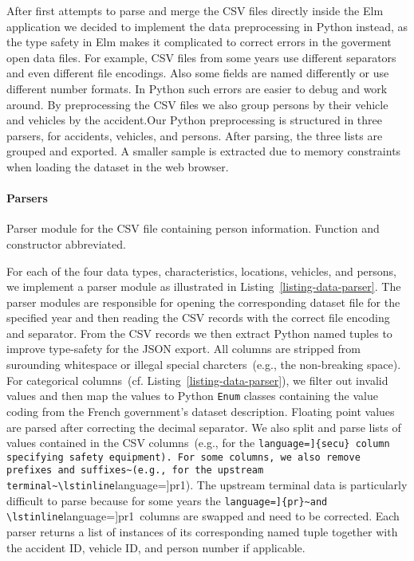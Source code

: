 After first attempts to parse and merge the CSV files directly inside the Elm application we decided to implement the data preprocessing in Python instead, as the type safety in Elm makes it complicated to correct errors in the goverment open data files. For example, CSV files from some years use different separators and even different file encodings. Also some fields are named differently or use different number formats. In Python such errors are easier to debug and work around. By preprocessing the CSV files we also group persons by their vehicle and vehicles by the accident.Our Python preprocessing is structured in three parsers, for accidents, vehicles, and persons. After parsing, the three lists are grouped and exported. A smaller sample is extracted due to memory constraints when loading the dataset in the web browser.

\paragraph{Parsers}
\begin{listing}
    
    \caption{Parser module for the CSV file containing person information. Function and constructor abbreviated.}
    \label{listing-data-parser}
\end{listing}
For each of the four data types, characteristics, locations, vehicles, and persons, we implement a parser module as illustrated in Listing~\ref{listing-data-parser}. The parser modules are responsible for opening the corresponding dataset file for the specified year and then reading the CSV records with the correct file encoding and separator. From the CSV records we then extract Python named tuples to improve type-safety for the JSON export. All columns are stripped from surounding whitespace or illegal special charcters~(e.g., the non-breaking space). For categorical columns~(cf. Listing~\ref{listing-data-parser}), we filter out invalid values and then map the values to Python \lstinline[language=Python]{Enum} classes containing the value coding from the French government's dataset description. Floating point values are parsed after correcting the decimal separator. We also split and parse lists of values contained in the CSV columns~(e.g., for the \lstinline[language=]{secu} column specifying safety equipment). For some columns, we also remove prefixes and suffixes~(e.g., for the upstream terminal~\lstinline[language=]{pr1}). The upstream terminal data is particularly difficult to parse because for some years the \lstinline[language=]{pr}~and \lstinline[language=]{pr1}~columns are swapped and need to be corrected. Each parser returns a list of instances of its corresponding named tuple together with the accident ID, vehicle ID, and person number if applicable.

